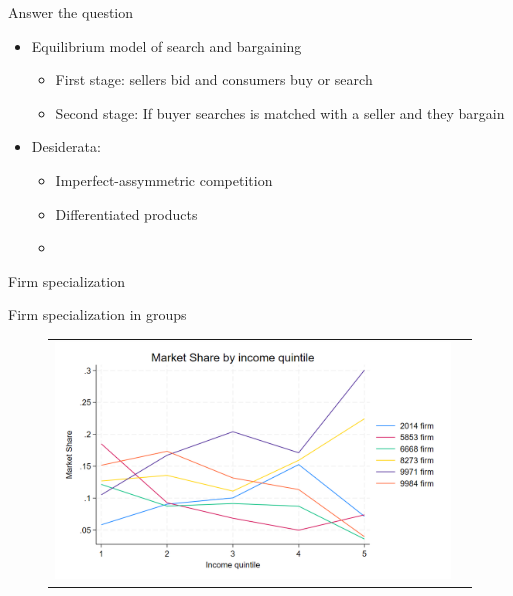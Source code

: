 \documentclass[10pt,aspectratio=169]{beamer}
\begin{document}
\begin{frame}{Answer the question}\label{slide:answer1}
    \begin{itemize}
        \item Equilibrium model of search and bargaining 
        \begin{itemize}
            \item First stage: sellers bid and consumers buy or search 
            \item Second stage: If buyer searches is matched with a seller and they bargain
        \end{itemize}
        \item Desiderata:
        \begin{itemize}
           \item Imperfect-assymmetric competition\hyperlink{slide:fig2}{}
            \item Differentiated products   \hyperlink{slide:fig3}{}
            \item 
        \end{itemize}
    \end{itemize}

\end{frame}




\begin{frame}{Firm specialization}\label{slide:fig1}    

Firm specialization in groups
\begin{figure}[H]
\centering{}%
\begin{tabular}{cc}
\includegraphics[scale=0.27]{../figures/IE3_supply_income_quintile.png}
\end{tabular}
\end{figure}

\hyperlink{slide:answer1}{}

\end{frame}
\end{document}
